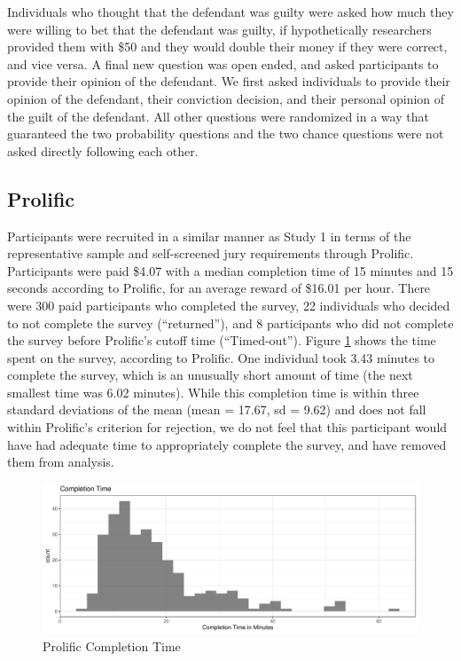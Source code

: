 \documentclass[print]{nuthesis}
\begin{document}
Individuals who thought that the defendant was guilty were asked how much they were willing to bet that the defendant was guilty, if hypothetically researchers provided them with \$50 and they would double their money if they were correct, and vice versa.
A final new question was open ended, and asked participants to provide their opinion of the defendant.
We first asked individuals to provide their opinion of the defendant, their conviction decision, and their personal opinion of the guilt of the defendant.
All other questions were randomized in a way that guaranteed the two probability questions and the two chance questions were not asked directly following each other.

\hypertarget{prolific-1}{%
\subsection{Prolific}\label{prolific-1}}

Participants were recruited in a similar manner as Study 1 in terms of the representative sample and self-screened jury requirements through Prolific.
Participants were paid \$4.07 with a median completion time of 15 minutes and 15 seconds according to Prolific, for an average reward of \$16.01 per hour.
There were 300 paid participants who completed the survey, 22 individuals who decided to not complete the survey (``returned''), and 8 participants who did not complete the survey before Prolific's cutoff time (``Timed-out'').
Figure \ref{fig:completiontime2} shows the time spent on the survey, according to Prolific.
One individual took 3.43 minutes to complete the survey, which is an unusually short amount of time (the next smallest time was 6.02 minutes).
While this completion time is within three standard deviations of the mean (mean = 17.67, sd = 9.62) and does not fall within Prolific's criterion for rejection, we do not feel that this participant would have had adequate time to appropriately complete the survey, and have removed them from analysis.

\begin{figure}

{\centering \includegraphics[width=\linewidth]{thesis_files/figure-latex/completiontime2-1} 

}

\caption{Prolific Completion Time}\label{fig:completiontime2}
\end{figure}
\end{document}
